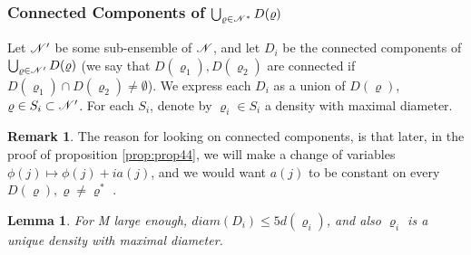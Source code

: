 \documentclass[11pt,reqno]{article}
\newtheorem{lemma}[thm]{Lemma}
\theoremstyle{definition}
\newtheorem*{remark}{Remark}
\numberwithin{equation}{section}
\begin{document}
\subsubsection{Connected Components of $\bigcup_{\varrho \in \mathscr{N}^*}D(\varrho)$}
Let $\mathscr{N}^\prime$ be some sub-ensemble of $\mathscr{N}$, and let $D_i$ be the connected components of $\bigcup_{\varrho \in \mathscr{N}^\prime}D(\varrho)$ (we say that $D(\varrho_1), D(\varrho_2)$ are connected if $D(\varrho_1)\cap D(\varrho_2)\neq\emptyset$). We express each $D_i$ as a union of $D(\varrho)$, $\varrho \in S_i \subset \mathscr{N}^\prime$. For each $S_i$, denote by $\varrho_i \in S_i$ a density with maximal diameter.
\begin{remark}
The reason for looking on connected components, is that later, in the proof of proposition \eqref{prop:prop44}, we will make a change of variables $\phi(j) \longmapsto \phi(j) + ia(j)$, and we would want $a(j)$ to be constant on every $D(\varrho), \varrho \neq \varrho^*$ .
\end{remark}

\begin{lemma} \label{lemma:appendixE1}
For M large enough, $diam(D_i) \leq 5 d(\varrho_i)$, and also $\varrho_i$ is a unique density with maximal diameter.
\end{lemma}
\end{document}
